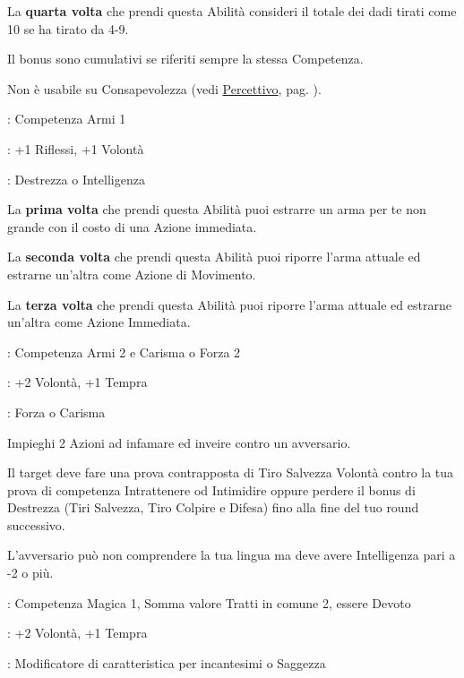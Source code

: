 \begin{multicols}{2}
La \textbf{quarta volta} che prendi questa Abilità consideri il totale dei dadi tirati come 10 se ha tirato da 4-9.

Il bonus sono cumulativi se riferiti sempre la stessa Competenza.

Non è usabile su Consapevolezza (vedi \hyperlink{Percettivo}{Percettivo}, pag. \pageref{Percettivo}).

\begin{description}[noitemsep, topsep=0pt, parsep=0pt, partopsep=0pt, leftmargin=0cm, labelwidth=2.5cm]
    \item[\textbf{Requisito}]: Competenza Armi 1
    \item[\textbf{Tiri Salvezza}]: +1 Riflessi, +1 Volontà
    \item[\textbf{Caratteristica}]: Destrezza o Intelligenza
\end{description}

La \textbf{prima volta} che prendi questa Abilità puoi estrarre un arma per te non grande con il costo di una Azione immediata.

La \textbf{seconda volta} che prendi questa Abilità puoi riporre l'arma attuale ed estrarne un'altra come Azione di Movimento.

La \textbf{terza volta} che prendi questa Abilità puoi riporre l'arma attuale ed estrarne un'altra come Azione Immediata.

\begin{description}[noitemsep, topsep=0pt, parsep=0pt, partopsep=0pt, leftmargin=0cm, labelwidth=2.5cm]
    \item[\textbf{Requisito}]: Competenza Armi 2 e Carisma o Forza 2
    \item[\textbf{Tiri Salvezza}]: +2 Volontà, +1 Tempra
    \item[\textbf{Caratteristica}]: Forza o Carisma
\end{description}

Impieghi 2 Azioni ad infamare ed inveire contro un avversario.

Il target deve fare una prova contrapposta di Tiro Salvezza Volontà contro la tua prova di competenza Intrattenere od Intimidire oppure perdere il bonus di Destrezza (Tiri Salvezza, Tiro Colpire e Difesa) fino alla fine del tuo round successivo.

L'avversario può non comprendere la tua lingua ma deve avere Intelligenza pari a -2 o più.

\begin{description}[noitemsep, topsep=0pt, parsep=0pt, partopsep=0pt, leftmargin=0cm, labelwidth=2.5cm]
    \item[\textbf{Requisito}]: Competenza Magica 1, Somma valore Tratti in comune 2, essere Devoto
    \item[\textbf{Tiri Salvezza}]: +2 Volontà, +1 Tempra
    \item[\textbf{Caratteristica}]: Modificatore di caratteristica per incantesimi o Saggezza
\end{description}


\end{multicols}
